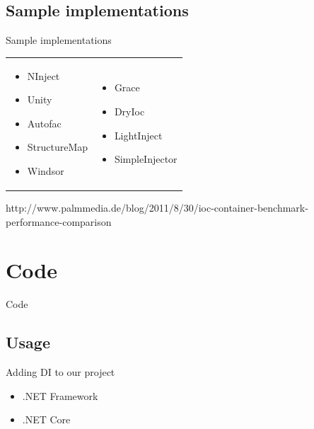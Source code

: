\documentclass{beamer}
\begin{document}
\subsection*{Sample implementations}

\begin{frame}{Sample implementations}
\begin{table}
	\begin{tabular}{ p{5cm} p{5cm} }
	
	\begin{minipage}{.5\textwidth}
\Large{\begin{itemize}
	\item NInject
	\item Unity
	\item Autofac
	\item StructureMap
	\item Windsor
\end{itemize}}
   	 \end{minipage}
   	 &
	\begin{minipage}{.5\textwidth}
\Large{\begin{itemize}
	\item Grace
	\item DryIoc
	\item LightInject
	\item SimpleInjector
\end{itemize}}
   	 \end{minipage}

	\end{tabular}
\end{table}
http://www.palmmedia.de/blog/2011/8/30/ioc-container-benchmark-performance-comparison
\end{frame}


\section{Code}

\begin{frame}{}
\begin{center}
\Huge{Code}
\end{center}
\end{frame}

\subsection*{Usage}
\begin{frame}{Adding DI to our project}
\begin{center}
\Large{\begin{itemize}
	\item .NET Framework
	\item .NET Core
\end{itemize}}
\end{center}
\end{frame}
\end{document}
